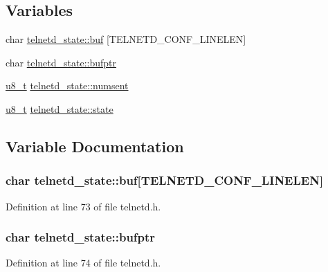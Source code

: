 \subsection*{Variables}
\begin{DoxyCompactItemize}
\item 
char \hyperlink{group__apps_ga54a466311575a727830a92a6c3621cb2}{telnetd\_\-state::buf} \mbox{[}TELNETD\_\-CONF\_\-LINELEN\mbox{]}
\item 
char \hyperlink{group__apps_ga5eced097547fd3fac4ba2a255493d921}{telnetd\_\-state::bufptr}
\item 
\hyperlink{group__uipfw_ga4caecabca98b43919dd11be1c0d4cd8e}{u8\_\-t} \hyperlink{group__apps_gad85fc90c30d1fc37c63c4844be5fe09d}{telnetd\_\-state::numsent}
\item 
\hyperlink{group__uipfw_ga4caecabca98b43919dd11be1c0d4cd8e}{u8\_\-t} \hyperlink{group__apps_ga41bf109b6a45328d5744c0a76563fb6c}{telnetd\_\-state::state}
\end{DoxyCompactItemize}


\subsection{Variable Documentation}
\hypertarget{group__apps_ga54a466311575a727830a92a6c3621cb2}{
\subsubsection[{buf}]{\setlength{\rightskip}{0pt plus 5cm}char {\bf telnetd\_\-state::buf}\mbox{[}TELNETD\_\-CONF\_\-LINELEN\mbox{]}}}
\label{group__apps_ga54a466311575a727830a92a6c3621cb2}


Definition at line 73 of file telnetd.h.

\hypertarget{group__apps_ga5eced097547fd3fac4ba2a255493d921}{
\subsubsection[{bufptr}]{\setlength{\rightskip}{0pt plus 5cm}char {\bf telnetd\_\-state::bufptr}}}
\label{group__apps_ga5eced097547fd3fac4ba2a255493d921}


Definition at line 74 of file telnetd.h.

